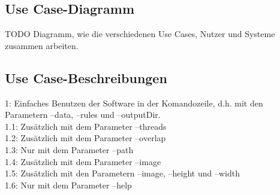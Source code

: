 \subsection{Use Case-Diagramm}
TODO Diagramm, wie die verschiedenen Use Cases, Nutzer und Systeme zusammen arbeiten.\\
\subsection{Use Case-Beschreibungen}
1: Einfaches Benutzen der Software in der Komandozeile, d.h. mit den Parametern --data, --rules und --outputDir.\\
1.1: Zusätzlich mit dem Parameter --threads\\
1.2: Zusätzlich mit dem Parameter --overlap\\
1.3: Nur mit dem Parameter --path\\
1.4: Zusätzlich mit dem Parameter --image\\
1.5: Zusätzlich mit den Parametern --image, --height und --width\\
1.6: Nur mit dem Parameter --help\\
